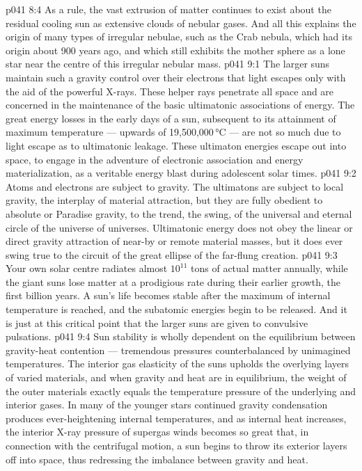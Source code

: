 \vs p041 8:4 As a rule, the vast extrusion of matter continues to exist about the residual cooling sun as extensive clouds of nebular gases. And all this explains the origin of many types of irregular nebulae, such as the Crab nebula, which had its origin about 900 years ago, and which still exhibits the mother sphere as a lone star near the centre of this irregular nebular mass.
\vs p041 9:1 The larger suns maintain such a gravity control over their electrons that light escapes only with the aid of the powerful X\hyp{}rays. These helper rays penetrate all space and are concerned in the maintenance of the basic ultimatonic associations of energy. The great energy losses in the early days of a sun, subsequent to its attainment of maximum temperature --- upwards of 19,500,000\,°C --- are not so much due to light escape as to ultimatonic leakage. These ultimaton energies escape out into space, to engage in the adventure of electronic association and energy materialization, as a veritable energy blast during adolescent solar times.
\vs p041 9:2 \pc Atoms and electrons are subject to gravity. The ultimatons are  subject to local gravity, the interplay of material attraction, but they are fully obedient to absolute or Paradise gravity, to the trend, the swing, of the universal and eternal circle of the universe of universes. Ultimatonic energy does not obey the linear or direct gravity attraction of near\hyp{}by or remote material masses, but it does ever swing true to the circuit of the great ellipse of the far\hyp{}flung creation.
\vs p041 9:3 \pc Your own solar centre radiates almost $10^{11}$ tons of actual matter annually, while the giant suns lose matter at a prodigious rate during their earlier growth, the first billion years. A sun’s life becomes stable after the maximum of internal temperature is reached, and the subatomic energies begin to be released. And it is just at this critical point that the larger suns are given to convulsive pulsations.
\vs p041 9:4 Sun stability is wholly dependent on the equilibrium between gravity\hyp{}heat contention --- tremendous pressures counterbalanced by unimagined temperatures. The interior gas elasticity of the suns upholds the overlying layers of varied materials, and when gravity and heat are in equilibrium, the weight of the outer materials exactly equals the temperature pressure of the underlying and interior gases. In many of the younger stars continued gravity condensation produces ever\hyp{}heightening internal temperatures, and as internal heat increases, the interior X\hyp{}ray pressure of supergas winds becomes so great that, in connection with the centrifugal motion, a sun begins to throw its exterior layers off into space, thus redressing the imbalance between gravity and heat.
